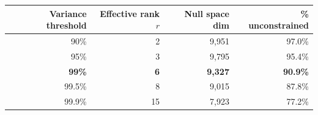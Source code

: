 \begin{tabular}{rrrr}
\toprule
Variance threshold & Effective rank $r$ & Null space dim & \% unconstrained \\
\midrule
90\% & 2 & 9,951 & 97.0\% \\
95\% & 3 & 9,795 & 95.4\% \\
\textbf{99\%} & \textbf{6} & \textbf{9,327} & \textbf{90.9\%} \\
99.5\% & 8 & 9,015 & 87.8\% \\
99.9\% & 15 & 7,923 & 77.2\% \\
\bottomrule
\end{tabular}

